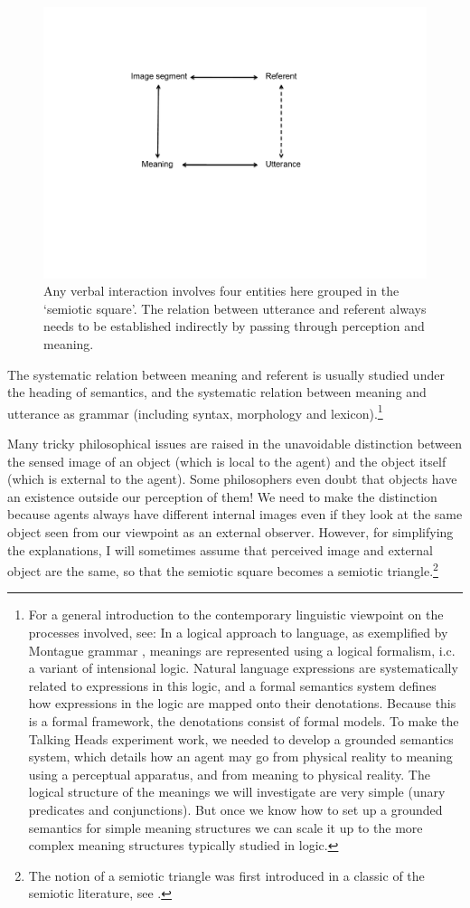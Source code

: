 \begin{figure}[htbp]
  \centerline{\includegraphics[width=.65\textwidth]{chap2/figs/triangle}}
\caption{\label{triangle} Any verbal interaction
involves four entities here grouped in the
`semiotic square'. The relation between utterance
and referent always needs to be established indirectly by 
passing through perception and meaning.}
\end{figure}

The systematic relation between meaning and referent is 
usually studied under the heading of semantics, and the 
systematic relation between meaning and utterance as
grammar (including syntax, morphology and lexicon).\footnote{
For a general introduction to the contemporary linguistic
viewpoint on the processes involved, see: \cite{Vanvalin:1997} 
In a logical approach to language, as 
exemplified by Montague grammar \cite{Montague:1974},  
meanings are represented using a logical formalism, i.c.
a variant of intensional logic. 
Natural language expressions are systematically 
related to expressions in this logic, and a
formal semantics system defines how expressions in the logic
are mapped onto their denotations. Because this is 
a formal framework, the denotations consist of formal 
models. To make the Talking Heads experiment work, 
we needed to develop a grounded semantics system, which details
how an agent may go from physical reality to meaning
using a perceptual apparatus, and from meaning 
to physical reality. The logical structure of 
the meanings we will investigate are very simple 
(unary predicates and conjunctions). But once we know how to 
set up a grounded semantics for simple meaning
structures we can scale it up to the more complex meaning
structures typically studied in logic.}

Many tricky philosophical issues are raised in 
the unavoidable distinction between the sensed image
of an object (which is local to the agent)
and the object itself (which is external to the 
agent). Some philosophers even doubt that objects 
have an existence outside our perception of them! 
We need to make the distinction because agents always
have different internal images even if they look at 
the same object seen from our viewpoint as an external
observer. However, for simplifying the 
explanations, I will sometimes assume that perceived
image and external object are the same, so that the 
semiotic square becomes a semiotic triangle.\footnote{
The notion of a semiotic triangle was first
introduced in a classic of the semiotic literature, 
see \cite{Ogden:1935}.}

